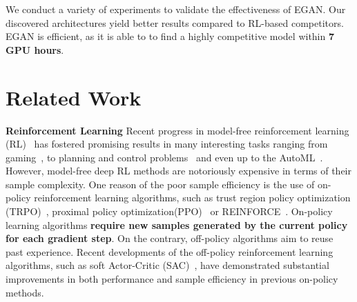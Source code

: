 \documentclass[runningheads]{llncs}
\begin{document}
We conduct a variety of experiments to validate the effectiveness of EGAN. Our discovered architectures yield better results compared to RL-based competitors. EGAN is efficient, as it is able to to find a highly competitive model within \textbf{7 GPU hours}.

\section{Related Work}


\textbf{Reinforcement Learning}
Recent progress in model-free reinforcement learning (RL)~\cite{sutton1992reinforcement} has fostered promising results in many interesting tasks ranging from gaming~\cite{mnih2013playing,silver2014deterministic}, to planning and control problems~\cite{hwangbo2019learning,kumar2016learning,xie2019iterative,han2019h_,chao2020real,han2020actor} and even up to the AutoML~\cite{zoph2016neural,pham2018efficient,liu2018progressive}. However, model-free deep RL methods are notoriously expensive in terms of their sample complexity. One reason of the poor sample efficiency is the use of on-policy reinforcement learning algorithms, such as trust region policy optimization (TRPO)~\cite{schulman2015trust}, proximal policy optimization(PPO)~\cite{schulman2017proximal}  or REINFORCE~\cite{williams1992simple}. On-policy learning algorithms \textbf{require new samples generated by the current policy for each gradient step}. On the contrary, off-policy algorithms aim to reuse past experience. Recent developments of the off-policy reinforcement learning algorithms, such as soft Actor-Critic (SAC)~\cite{haarnoja2018soft}, have demonstrated substantial improvements in both performance and sample efficiency in previous on-policy methods.
\end{document}
